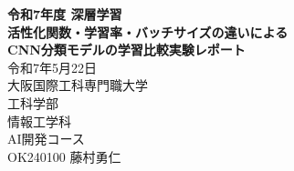 \begin{titlepage}
    \centering
    \textbf{\LARGE 令和7年度 深層学習}
     \\
    \textbf{\LARGE
        活性化関数・学習率・バッチサイズの違いによる\\
        CNN分類モデルの学習比較実験レポート
    }
     \\
    \large 令和7年5月22日
    \vspace{10pt} \\
    \large 大阪国際工科専門職大学 \\
    \large 工科学部 \\
    \large 情報工学科 \\
    \large AI開発コース
    \vspace{10pt} \\
    \large OK240100 藤村勇仁
\end{titlepage}

